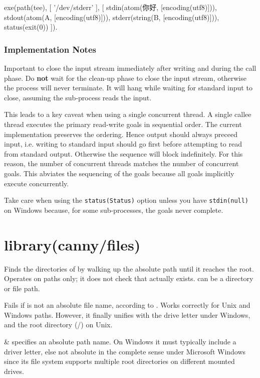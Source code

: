 \begin{description}
\begin{code}
exe(path(tee),
    [ '/dev/stderr'
    ],
    [ stdin(atom(你好, [encoding(utf8)])),
      stdout(atom(A, [encoding(utf8)])),
      stderr(string(B, [encoding(utf8)])),
      status(exit(0))
    ]).
\end{code}

\subsection{Implementation Notes}

Important to close the input stream immediately after writing and
during the call phase. Do \textbf{not} wait for the clean-up phase to close
the input stream, otherwise the process will never terminate. It
will hang while waiting for standard input to close, assuming the
sub-process reads the input.

This leads to a key caveat when using a single concurrent thread. A
single callee thread executes the primary read-write goals in
sequential order. The current implementation preserves the 
ordering. Hence output should always preceed input, i.e. writing to
standard input should go first before attempting to read from
standard output. Otherwise the sequence will block indefinitely. For
this reason, the number of concurrent threads matches the number of
concurrent goals. This abviates the sequencing of the goals because
all goals implicitly execute concurrently.

\begin{tags}
Take care when using the \verb$status(Status)$ option unless you have
\verb$stdin(null)$ on Windows because, for some sub-processes, the goals
never complete.
\end{tags}
\end{description}

\chapter{library(canny/files)}\label{sec:files}

\begin{description}
Finds the directories of  by walking up the absolute path
until it reaches the root. Operates on paths only; it does not check
that  actually exists.  can be a directory or file
path.

Fails if  is not an absolute file name, according to
. Works correctly for Unix and Windows paths.
However, it finally unifies with the drive letter under Windows, and
the root directory (/) on Unix.

\begin{arguments}
 & specifies an absolute path name. On Windows it must
typically include a driver letter, else not absolute in the complete
sense under Microsoft Windows since its file system supports
multiple root directories on different mounted drives. \\
\end{arguments}
\end{description}

